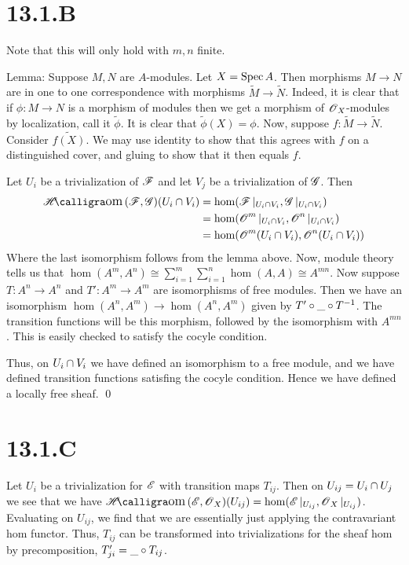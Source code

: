 \documentclass{article}
\begin{document}
\section{13.1.B}
Note that this will only hold with $m, n$ finite.

Lemma: Suppose $M, N$ are $A$-modules. Let
$X=\operatorname{Spec} A$. Then morphisms $M \to N$ are in one to one
correspondence with morphisms $\widetilde{M} \to \widetilde{N}$. Indeed, it is clear that
if $\phi: M \to N$ is a morphism of modules then we get a morphism of
$\operatorname{\mathscr{O}}_X$-modules by localization, call it $\widetilde{\phi}$.
It is clear that $\widetilde{\phi}(X)=\phi$. Now, suppose $f: \widetilde{M} \to \widetilde{N}$.
Consider $\widetilde{f(X)}$. We may use identity to show that this agrees
with $f$ on a distinguished cover, and gluing to show that
it then equals $f$.

Let $U_i$ be a trivialization of $\operatorname{\mathscr{F}}$ and
let $V_j$ be a trivialization of $\operatorname{\mathscr{G}}$. Then
\begin{align*}
    \Hom(\Fsh, \Gsh)(U_i \intersect V_i) & =\hom(\Fsh|_{U_i \intersect V_i}, \Gsh|_{U_i \intersect V_i})      \\
                                         & = \hom(\Osh^m|_{U_i \intersect V_i}, \Osh^n|_{U_i \intersect V_i}) \\
                                         & = \hom(\Osh^m(U_i \intersect V_i), \Osh^n(U_i \intersect V_i))
\end{align*}
Where the last isomorphism follows from the lemma above. Now, module theory
tells us that $\hom(A^m, A^n) \cong \sum_{i=1}^m
    \sum_{i=1}^n
    \hom(A,A) \cong A^{mn}$. Now suppose $T: A^n \to A^n$ and
$T': A^m \to A^m$ are isomorphisms of free modules. Then we have an
isomorphism $\hom(A^n, A^m) \to \hom(A^n, A^m)$ given by $T' \circ \_ \circ T^{-1}$. The
transition functions will be this morphism, followed by the isomorphism with
$A^{mn}$. This is easily checked to satisfy the cocyle condition.

Thus, on $U_i \cap V_i$ we have defined an isomorphism to a free
module, and we have defined transition functions satisfing the cocyle
condition. Hence we have defined a locally free sheaf. \qed

\section{13.1.C}
Let $U_i$ be a trivialization for $\operatorname{\mathscr{E}}$
with transition maps $T_{ij}$. Then on $U_{ij}=U_i \cap U_j$
we see that we have $\Hom(\Esh, \Osh_X)(U_{ij})=\hom(\Esh|_{U_{ij}}, \Osh_X|_{U_{ij}})$. Evaluating on
$U_{ij}$, we find that we are essentially just applying the
contravariant hom functor. Thus, $T_{ij}$ can be transformed
into trivializations for the sheaf hom by precomposition,
$T'_{ji} = \_ \circ T_{ij}$.
\end{document}

